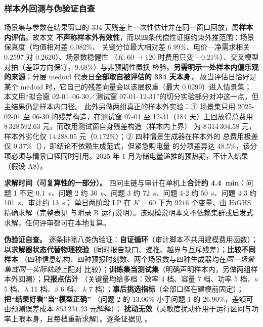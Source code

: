 \subsubsection{样本外回测与伪验证自查}\label{sec:oos-app}
场景集与参数在结果窗口的 334 天残差上一次性估计并在同一窗口回放，属\textbf{样本内评估}。故本文
\textbf{不声称样本外有效性}，而以四条代偿性证据约束外推范围：场景保真度（均值相对差 \(0.082\%\)、
关键分位最大相对差 \(6.99\%\)、电价—净需求相关 \(0.2597\) 对 \(0.2620\)）、场景数稳健性
（\(K:60\to120\) 时费用只变 \(-0.21\%\)）、交叉模型对拍（差距方向保守，\(9.68\%\)）与非预期性置换
检验。\textbf{另需明示一处样本内偏乐观的来源}：分层 medoid 代表日\textbf{全部取自被评估的 334 天本身}，
故当评估日恰好是某个 medoid 时，它自己的残差向量会以该层权重（最大 \(0.0299\)）进入情景集；
本文用“拟合窗 02-01--06-30／测试窗 07-01--12-31”的切分实验部分对冲这一点，但主结果仍是样本内口径。
此外另做两组真正的样本外实验：① 场景集只用 2025-02-01 至 06-30 的残差构造，在测试窗
07-01 至 12-31（184 天）上回放得总费用 \(8\,328\,592.63\) 元，而改用测试窗自身残差构造（样本内上界）
为 \(8\,314\,304.58\) 元，样本外劣化仅 \(14\,288.05\) 元（\(0.172\%\)）；② 四种情景生成器在样本外的
总费用极差仅 \(0.37\%\)（），即结论不依赖生成范式，但紧急购电量
的分项差异达 \(48.5\%\)，该分项必须与情景口径同时引用。2025 年 1 月为储电量递推的预热期，不计入结果
（假设 A8）。

\textbf{求解时间（可复算性的一部分）。} 四问主链与审计在单机上\textbf{合计约 4.4~min}：问题 1 不足
\(0.1\)~s、问题 2 约 30~s、问题 3 约 72~s、问题 4-2 约 50~s、问题 4-3 约 101~s、审计约 13~s；
单日两阶段 LP 在 \(K=60\) 下为 \(9216\) 个变量、由 HiGHS 精确求解（完整表见
与附录 B 运行说明）。该规模说明本文不依赖集群或启发式
求解，任何评审都可在本地复算。

\textbf{伪验证自查。} 逐条排除八类伪验证：\textbf{自证循环}（审计脚本不共用建模费用函数）；
\textbf{以求解器状态代替物理校验}（同时报告缺口、递推、越界与互斥残差）；\textbf{比较不同样本}
（四种信息结构、四种预报时刻数、两个场景数与四种生成器均在\emph{同一场景集或同一实际轨迹}上配对
比较）；\textbf{训练集当测试集}（明确声明样本内，另做两组样本外回测）；\textbf{只报点估计}
（关键量均给多档：效率 4 档、容量 7 档、功率 5 档、\(\kappa\) 5 档、\(\lambda\) 11 档、\(\beta\) 6 档、
\(k\) 7 档）；\textbf{事后挑选指标}（全部口径在建模前固定）；\textbf{把“结果好看”当“模型正确”}
（问题 2 的 \(13.06\%\) 小于问题 1 的 \(26.90\%\)，差额可由预测误差成本 \(853\,231.23\) 元解释）；
\textbf{扰动无效}（灵敏度扰动作用于运行区间与功率上限本身，且每档重新求解）。逐条证据见
。

